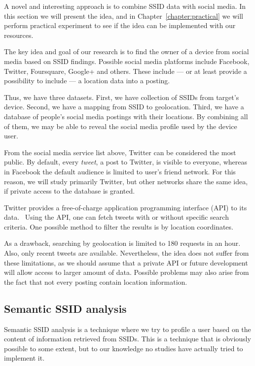 \documentclass[12pt,a4paper,oneside,pdftex]{report}
\begin{document}
A novel and interesting approach is to combine SSID data with social media. In this section we will present the idea, and in Chapter~\ref{chapter:practical} we will perform practical experiment to see if the idea can be implemented with our resources.

The key idea and goal of our research is to find the owner of a device from social media based on SSID findings. Possible social media platforms include Facebook, Twitter, Foursquare, Google+ and others. These include --- or at least provide a possibility to include --- a location data into a posting. 

Thus, we have three datasets. First, we have collection of SSIDs from target's device. Second, we have a mapping from SSID to geolocation. Third, we have a database of people's social media postings with their locations. By combining all of them, we may be able to reveal the social media profile used by the device user.

From the social media service list above, Twitter can be considered the most public. By default, every \emph{tweet}, a post to Twitter, is visible to everyone, whereas in Facebook the default audience is limited to user's friend network. For this reason, we will study primarily Twitter, but other networks share the same idea, if private access to the database is granted.

Twitter provides a free-of-charge application programming interface (API) to its data.~\cite{twitterapi} Using the API, one can fetch tweets with or without specific search criteria. One possible method to filter the results is by location coordinates.

As a drawback, searching by geolocation is limited to 180 requests in an hour. Also, only recent tweets are available. Nevertheless, the idea does not suffer from these limitations, as we should assume that a private API or future development will allow access to larger amount of data. Possible problems may also arise from the fact that not every posting contain location information.


\subsection{Semantic SSID analysis}

Semantic SSID analysis is a technique where we try to profile a user based on the content of information retrieved from SSIDs. This is a technique that is obviously possible to some extent, but to our knowledge no studies have actually tried to implement it.
\end{document}
